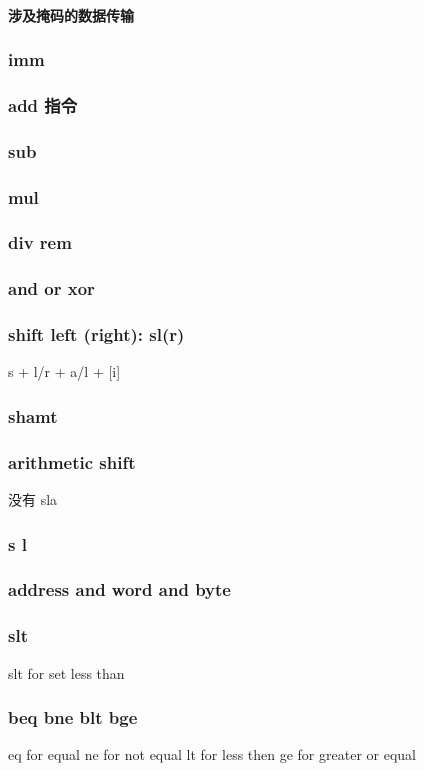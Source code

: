 \documentclass[12pt]{ctexart}
\theoremstyle{definition}
\theoremstyle{definition}
\theoremstyle{plain}
\begin{document}
\paragraph{涉及掩码的数据传输}


\subsubsection{imm}
\subsubsection{add 指令}
\subsubsection{sub}
\subsubsection{mul}
\subsubsection{div rem}
\subsubsection{and or xor}
\subsubsection{shift left (right): sl(r)}
s + l/r + a/l + [i]
\subsubsection{shamt}
\subsubsection{arithmetic shift}
没有 sla
\subsubsection{s l}
\subsubsection{address and word and byte}
\subsubsection{slt}
slt for set less than
\subsubsection{beq bne blt bge}
eq for equal 
ne for not equal 
lt for less then 
ge for greater or equal 
\end{document}
